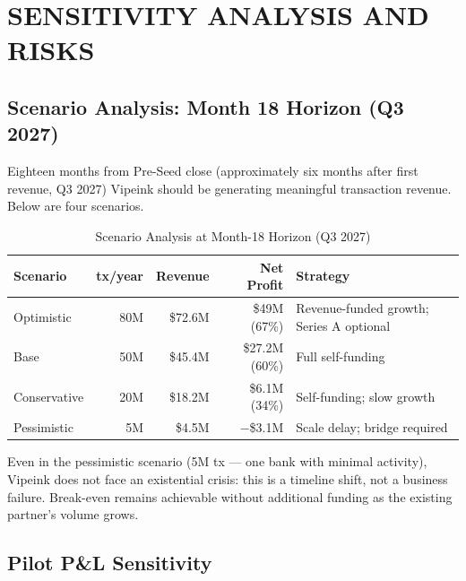 \documentclass[11pt,a4paper]{article}
\begin{document}
\FloatBarrier
\section{SENSITIVITY ANALYSIS AND RISKS}

\subsection*{Scenario Analysis: Month 18 Horizon (Q3 2027)}

Eighteen months from Pre-Seed close (approximately six months after first revenue, Q3 2027) Vipeink should be generating meaningful transaction revenue. Below are four scenarios.

\begin{table}[htbp]
\centering
\caption{Scenario Analysis at Month-18 Horizon (Q3 2027)}
\begin{tabularx}{\linewidth}{@{}lrrrX@{}}
\toprule
\textbf{Scenario} & \textbf{tx/year} & \textbf{Revenue} & \textbf{Net Profit} & \textbf{Strategy} \\
\midrule
Optimistic   & 80M  & \$72.6M  & \textcolor{okgreen}{\$49M (67\%)}   & Revenue-funded growth; Series A optional \\
Base         & 50M  & \$45.4M  & \textcolor{okgreen}{\$27.2M (60\%)} & Full self-funding \\
Conservative & 20M  & \$18.2M  & \textcolor{okgreen}{\$6.1M (34\%)}  & Self-funding; slow growth \\
Pessimistic  & 5M   & \$4.5M   & \textcolor{warnred}{$-$\$3.1M}      & Scale delay; bridge required \\
\bottomrule
\end{tabularx}
\end{table}

Even in the pessimistic scenario (5M tx --- one bank with minimal activity), Vipeink does not face an existential crisis: this is a timeline shift, not a business failure. Break-even remains achievable without additional funding as the existing partner's volume grows.

\subsection*{Pilot P\&L Sensitivity}
\end{document}
